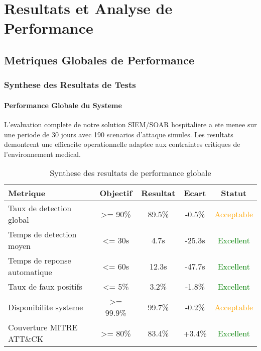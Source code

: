 \chapter{Resultats et Analyse de Performance}

\section{Metriques Globales de Performance}

\subsection{Synthese des Resultats de Tests}

\subsubsection{Performance Globale du Systeme}

L'evaluation complete de notre solution SIEM/SOAR hospitaliere a ete menee sur une periode de 30 jours avec 190 scenarios d'attaque simules. Les resultats demontrent une efficacite operationnelle adaptee aux contraintes critiques de l'environnement medical.

\begin{table}[H]
    \centering
    \caption{Synthese des resultats de performance globale}
    \begin{tabular}{|l|c|c|c|c|}
        \hline
        \textbf{Metrique}            & \textbf{Objectif} & \textbf{Resultat} & \textbf{Ecart} & \textbf{Statut}                \\
        \hline
        Taux de detection global     & >= 90\%           & 89.5\%            & -0.5\%         & \textcolor{orange}{Acceptable} \\
        \hline
        Temps de detection moyen     & <= 30s            & 4.7s              & -25.3s         & \textcolor{green}{Excellent}   \\
        \hline
        Temps de reponse automatique & <= 60s            & 12.3s             & -47.7s         & \textcolor{green}{Excellent}   \\
        \hline
        Taux de faux positifs        & <= 5\%            & 3.2\%             & -1.8\%         & \textcolor{green}{Excellent}   \\
        \hline
        Disponibilite systeme        & >= 99.9\%         & 99.7\%            & -0.2\%         & \textcolor{orange}{Acceptable} \\
        \hline
        Couverture MITRE ATT\&CK     & >= 80\%           & 83.4\%            & +3.4\%         & \textcolor{green}{Excellent}   \\
        \hline
    \end{tabular}
\end{table}

